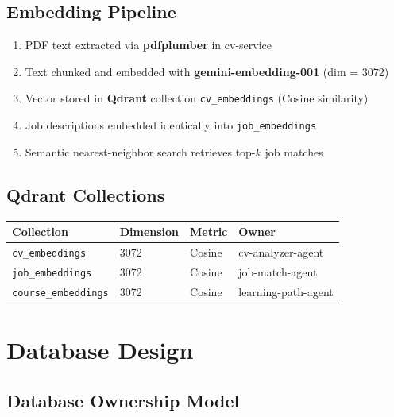 \documentclass[12pt, a4paper]{report}
\begin{document}
\section{Embedding Pipeline}

\begin{tcolorbox}[colback=darkgray!8, colframe=primary!40, arc=5pt]
\small
\begin{enumerate}[leftmargin=*]
  \item PDF text extracted via \textbf{pdfplumber} in cv-service
  \item Text chunked and embedded with \textbf{gemini-embedding-001} (dim = 3072)
  \item Vector stored in \textbf{Qdrant} collection \texttt{cv\_embeddings} (Cosine similarity)
  \item Job descriptions embedded identically into \texttt{job\_embeddings}
  \item Semantic nearest-neighbor search retrieves top-$k$ job matches
\end{enumerate}
\end{tcolorbox}

\section{Qdrant Collections}

\begin{center}
\begin{tabular}{llll}
\toprule
\rowcolor{purple!20}
\textbf{Collection} & \textbf{Dimension} & \textbf{Metric} & \textbf{Owner} \\
\midrule
\texttt{cv\_embeddings} & 3072 & Cosine & cv-analyzer-agent \\
\texttt{job\_embeddings} & 3072 & Cosine & job-match-agent \\
\texttt{course\_embeddings} & 3072 & Cosine & learning-path-agent \\
\bottomrule
\end{tabular}
\end{center}

\chapter{Database Design}

\section{Database Ownership Model}
\end{document}
